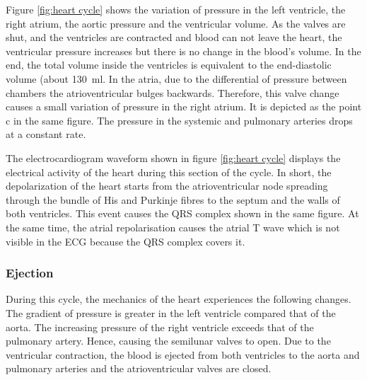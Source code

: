 Figure \ref{fig:heart cycle} shows the variation of pressure in the left ventricle, the right atrium, the aortic pressure and the ventricular volume. As the valves are shut, and the ventricles are contracted and blood can not leave the heart, the ventricular pressure increases but there is no change in the blood's volume. In the end, the total volume inside the ventricles is equivalent to the end-diastolic volume (about \SI{130}{\milli\litre}. In the atria, due to the differential of pressure between chambers the atrioventricular bulges backwards. Therefore, this valve change causes a small variation of pressure in the right atrium. It is depicted as the point c in the same figure. The pressure in the systemic and pulmonary arteries drops at a constant rate. 


The electrocardiogram waveform shown in figure \ref{fig:heart cycle} displays the electrical activity of the heart during this section of the cycle. In short, the depolarization of the heart starts from the atrioventricular node spreading through the bundle of His and Purkinje fibres to the septum and the walls of both ventricles. This event causes the QRS complex shown in the same figure. At the same time, the atrial repolarisation causes the atrial T wave which is not visible in the ECG because the QRS complex covers it.



\subsubsection{Ejection}
During this cycle, the mechanics of the heart experiences the following changes. The gradient of pressure is greater in the left ventricle compared that of the aorta. The increasing pressure of the right ventricle exceeds that of the pulmonary artery. Hence, causing the semilunar valves to open. Due to the ventricular contraction, the blood is ejected from both ventricles to the aorta and pulmonary arteries and the atrioventricular valves are closed.


